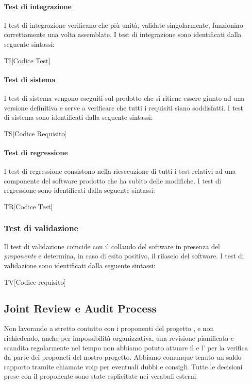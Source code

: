 \paragraph{Test di integrazione}
I test di integrazione verificano che più unità, validate singolarmente, funzionino
correttamente una volta assemblate. I test di integrazione sono identificati dalla seguente sintassi:
\begin{center}
  TI[Codice Test]
\end{center}

\paragraph{Test di sistema}
I test di sistema vengono eseguiti sul prodotto che si ritiene essere giunto ad
una versione definitiva e serve a verificare che tutti i requisiti siano soddisfatti. I test di sistema sono identificati dalla seguente sintassi:
\begin{center}
  TS[Codice Requisito]
\end{center}

\paragraph{Test di regressione}
I test di regressione consistono nella riesecuzione di tutti i test relativi ad una
componente del software prodotto che ha subito delle modifiche. I test di regressione sono identificati dalla seguente sintassi:
\begin{center}
  TR[Codice Test]
\end{center}




\subsubsection{Test di validazione}
Il test di validazione coincide con il collaudo del software in presenza del \textit{proponente} e determina, in caso di esito positivo, il rilascio del software. I test di validazione sono identificati dalla seguente sintassi:
\begin{center}
  TV[Codice requisito]
\end{center}

\subsection{Joint Review e Audit Process}
Non lavorando a stretto contatto con i proponenti del progetto , e non richiedendo, anche per impossibilità organizzativa, una revisione pianificata e scandita regolarmente nel tempo non abbiamo potuto attuare il   e l' per la verifica da parte dei proponeti del nostro progetto. Abbiamo comunque tenuto un saldo rapporto  tramite chiamate voip per eventuali dubbi e consigli. Tutte le decisioni prese con il proponente sono state esplicitate nei verabali esterni.

